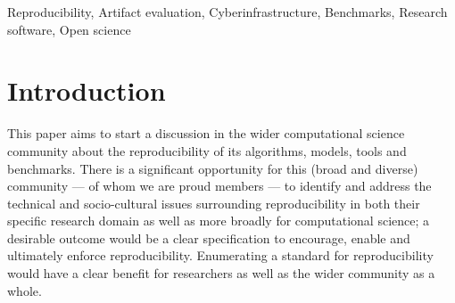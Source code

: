\documentclass[conference]{IEEEtran}
\begin{document}
%

\begin{IEEEkeywords}
Reproducibility, Artifact evaluation, Cyberinfrastructure, Benchmarks, Research software, Open science
\end{IEEEkeywords}


\section{Introduction}

This paper aims to start a discussion in the wider computational
science community about the reproducibility of its algorithms, models,
tools and benchmarks. There is a significant opportunity for this
(broad and diverse) community --- of whom we are proud members --- to
identify and address the technical and socio-cultural issues
surrounding reproducibility in both their specific research domain as
well as more broadly for computational science; a desirable outcome
would be a clear specification to encourage, enable and ultimately
enforce reproducibility. Enumerating a standard for reproducibility
would have a clear benefit for researchers as well as the wider
community as a whole.
\end{document}
